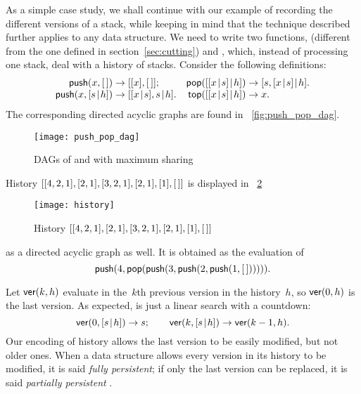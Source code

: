 As a simple case study, we shall continue with our example of
recording the different versions of a stack, while keeping in mind
that the technique described further applies to any data structure. We
need to write two functions, 
(different from the one defined in section~\ref{sec:cutting}) and
, which, instead of processing one
stack, deal with a history of stacks. Consider the following
definitions:
\begin{equation}
\begin{array}{@{}r@{\;}c@{\;}l@{\quad}r@{\;}c@{\;}l@{}}
\fun{push}(x,\el) & \rightarrow & [[x],\el];
& \fun{pop}(\cons{\cons{x}{s}}{h}) & \rightarrow &
                                     \cons{s,\cons{x}{s}}{h}.\\
\fun{push}(x,\cons{s}{h}) & \rightarrow &
\cons{\cons{x}{s},s}{h}. & 
\fun{top}(\cons{\cons{x}{s}}{h}) & \rightarrow & x.
\end{array}
\label{eq:push_pop_persistence}
\end{equation}
The corresponding directed acyclic graphs are found in
\fig~\vref{fig:push_pop_dag}.
\begin{figure}
\centering
\texttt{[image: push\_pop\_dag]}
\caption{DAGs of  and  with maximum sharing
\label{fig:push_pop_dag}}
\end{figure}
History \([[4,2,1],[2,1],[3,2,1],[2,1],[1],[\,]]\) is displayed in
\fig~\ref{fig:history}
\begin{figure}[!b]
\centering
\texttt{[image: history]}
\caption{History \([[4,2,1],[2,1],[3,2,1],[2,1],[1],[\,]]\)
\label{fig:history}}
\end{figure}
as a directed acyclic graph as well. It is obtained as the evaluation
of
\begin{equation}
\textsf{push}(4, \textsf{pop}(\textsf{push}(3, \textsf{push}(2,
\textsf{push}(1, [\,]))))).
\label{ex:history}
\end{equation}

Let \(\textsf{ver}(k,h)\)  evaluate in the~\(k\)th
previous version in the history~\(h\), so \(\textsf{ver}(0,h)\) is the
last version. As expected,  is just a linear search with a
countdown:
\begin{equation*}
\textsf{ver}(0,[{s}\!\mid\!{h}]) \rightarrow s;\qquad
\textsf{ver}(k,[{s}\!\mid\!{h}]) \rightarrow \textsf{ver}(k-1,h).
\end{equation*}
Our encoding of history allows the last version to be easily modified,
but not older ones. When a data structure allows every version in its
history to be modified, it is said \emph{fully
  persistent}; if only the last version
can be replaced, it is said \emph{partially persistent}
\citep{MehlhornTsakalidis_1990}.

